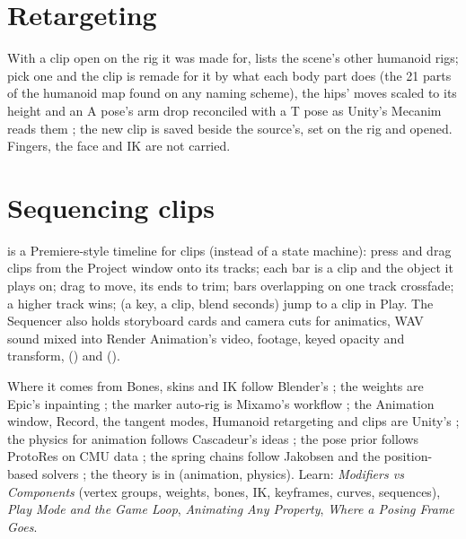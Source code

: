 \section{Retargeting}
With a clip open on the rig it was made for,  lists the scene's other humanoid rigs; pick one and the clip
is remade for it by what each body part does (the 21 parts of the humanoid map found on any naming scheme), the hips'
moves scaled to its height and an A pose's arm drop reconciled with a T pose as Unity's Mecanim reads them
\cite{UnityHumanoidAvatars}; the new clip is saved beside the source's, set on the rig and opened. Fingers, the face
and IK are not carried.

\section{Sequencing clips}
 is a Premiere-style timeline for clips (instead of a state machine): press  and
drag  clips from the Project window onto its tracks; each bar is a clip and the object it plays on; drag
to move, its ends to trim; bars overlapping on one track crossfade; a higher track wins;  (a key, a clip,
blend seconds) jump to a clip in Play. The Sequencer also holds storyboard cards and camera cuts for animatics, WAV
sound mixed into Render Animation's video, footage, keyed opacity and transform,  () and
 ().

\begin{fromnote}{Where it comes from}
Bones, skins and IK follow Blender's \cite{Blender2026, Welman1993Inverse}; the weights are Epic's inpainting
\cite{Abdrashitov2023Robust}; the marker auto-rig is Mixamo's workflow \cite{Mixamo2026}; the Animation window,
Record, the tangent modes, Humanoid retargeting and  clips are Unity's \cite{UnityManual2026,
UnityHumanoidAvatars}; the physics for animation follows Cascadeur's ideas \cite{Cascadeur2026}; the pose prior
follows ProtoRes \cite{Oreshkin2022Protores} on CMU data \cite{CMUmocap2026}; the spring chains follow Jakobsen and
the position-based solvers \cite{Jakobsen2001, Macklin2016}; the theory is in \cite{Gregory2018vol2} (animation,
physics). Learn: \emph{Modifiers vs Components} (vertex groups, weights, bones, IK, keyframes, curves, sequences),
\emph{Play Mode and the Game Loop}, \emph{Animating Any Property}, \emph{Where a Posing Frame Goes}.
\end{fromnote}
